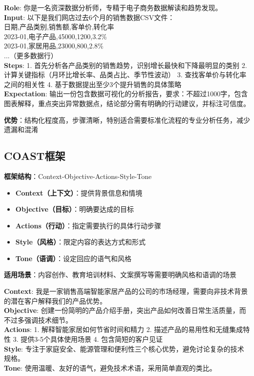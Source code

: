 \documentclass[12pt]{ctexart}
\begin{document}
\begin{promptbox}
\textbf{Role}: 你是一名资深数据分析师，专精于电子商务数据解读和趋势发现。\\

\textbf{Input}: 以下是我们网店过去6个月的销售数据CSV文件：\\
日期,产品类别,销售额,客单价,转化率\\
2023-01,电子产品,45000,1200,3.2\%\\
2023-01,家居用品,23000,800,2.8\%\\
...（更多数据行）\\

\textbf{Steps}: 
1. 首先分析各产品类别的销售趋势，识别增长最快和下降最明显的类别
2. 计算关键指标（月环比增长率、品类占比、季节性波动）
3. 查找客单价与转化率之间的相关性
4. 基于数据提出至少3个提升销售的具体策略\\

\textbf{Expectation}: 输出一份包含数据可视化的分析报告，要求：不超过1000字，包含图表解释，重点突出异常数据点，结论部分需有明确的行动建议，并标注可信度。
\end{promptbox}

\textbf{优势}：结构化程度高，步骤清晰，特别适合需要标准化流程的专业分析任务，减少遗漏和混淆

\subsection{COAST框架}

\textbf{框架结构}：Context-Objective-Actions-Style-Tone

\begin{itemize}
  \item \textbf{Context（上下文）}：提供背景信息和情境
  \item \textbf{Objective（目标）}：明确要达成的目标
  \item \textbf{Actions（行动）}：指定需要执行的具体行动步骤
  \item \textbf{Style（风格）}：限定内容的表达方式和形式
  \item \textbf{Tone（语调）}：设定回应的语气和风格
\end{itemize}

\textbf{适用场景}：内容创作、教育培训材料、文案撰写等需要明确风格和语调的场景

\begin{promptbox}
\textbf{Context}: 我是一家销售高端智能家居产品的公司的市场经理，需要向非技术背景的潜在客户解释我们的产品优势。\\

\textbf{Objective}: 创建一份简明的产品介绍手册，突出产品如何改善日常生活质量，而不过多强调技术细节。\\

\textbf{Actions}: 
1. 解释智能家居如何节省时间和精力
2. 描述产品的易用性和无缝集成特性
3. 提供3-5个具体使用场景
4. 包含简短的客户见证\\

\textbf{Style}: 专注于家庭安全、能源管理和便利性三个核心优势，避免讨论复杂的技术规格。\\

\textbf{Tone}: 使用温暖、友好的语气，避免技术术语，采用简单直观的类比。
\end{promptbox}
\end{document}
